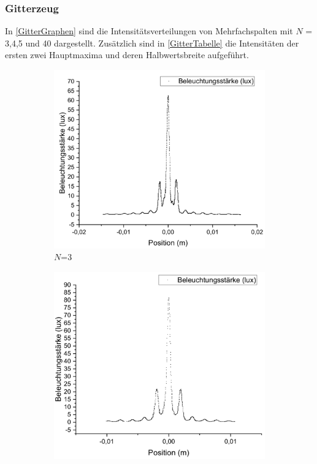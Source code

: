 \documentclass[
	a4paper,
	12pt,
	pagesize,
	ngerman
]{scrartcl}
\begin{document}
	\subsubsection{Gitterzeug} %
	In \cref{GitterGraphen} sind die Intensitätsverteilungen von Mehrfachspalten mit $N$ = 3,4,5 und 40 dargestellt. 
	Zusätzlich sind in \cref{GitterTabelle} die Intensitäten der ersten zwei Hauptmaxima und deren Halbwertsbreite aufgeführt. 

	\begin{figure}[H]
		\centering
		\begin{subfigure}{.5\textwidth}
			\centering
			\includegraphics[width=1\linewidth]{GitterN3ZOOM}
			\caption{$N$=3}	
		\end{subfigure}%
		\begin{subfigure}{.5\textwidth}
			\centering
			\includegraphics[width=1\linewidth]{GitterN4ZOOM}

\end{subfigure}
\end{figure}
\end{document}
